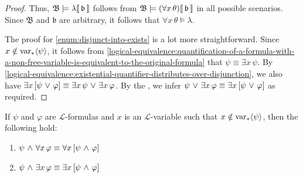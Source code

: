 \begin{proof}
    \vspace{0.3cm}
    \noindent
    Thus, \(  \mathfrak{B} \models \lambda\llbracket\, \mathfrak{b} \,\rrbracket \) follows from \( \folwffsatisfaction{\mathfrak{B}}{\mleft( \forall x \, \theta \mright)}{\mathfrak{b}} \)
    in all possible scenarios. Since \( \mathfrak{B} \) and \( \mathfrak{b} \) are arbitrary, it follows that \( \forall x \, \theta \models \lambda \).

    \vspace{0.3cm}
    \noindent
    The proof for \ref{enum:disjunct-into-exists} is a lot more straightforward.
    Since \( x \notin \operatorname{var}_{\ast} \langle\psi\rangle \), it follows from \cref{logical-equivalence:quantification-of-a-formula-with-a-non-free-variable-is-equivalent-to-the-original-formula}
    that \( \psi \equiv \exists x \, \psi \).
    By \cref{logical-equivalence:existential-quantifier-distributes-over-disjunction},
    we also have \( \exists x \, \mleft[ \psi \,\,{\lor}\,\, \varphi \mright] \equiv \exists x \, \psi \,\,{\lor}\,\, \exists x \, \varphi \).
    By the , we infer
    \( \psi \,\,{\lor}\,\, \exists x \, \varphi \equiv \exists x \, \mleft[ \psi \,\,{\lor}\,\, \varphi \mright] \) as required.
\end{proof}

\begin{thm}
     \label{logical-equivalence:grouping-conjuncts-into-quantified-formula}
    If \( \psi \) and \( \varphi \) are \( \mathcal{L} \)-formulas and \( x \) is an \( \mathcal{L} \)-variable such that
    \( x \notin \operatorname{var}_{\ast} \langle\psi\rangle \), then the following hold:
    \begin{enumerate}[topsep=2pt,label=\textup{\texttt{(\alph*)}}]
        \item \(  \psi \,\,{\land}\,\, \forall x \, \varphi \equiv \forall x \, \mleft[ \psi \,\,{\land}\,\, \varphi \mright]  \)  \label{enum:conjuncts-into-all}
        \item \(  \psi \,\,{\land}\,\, \exists x \, \varphi \equiv \exists x \, \mleft[ \psi \,\,{\land}\,\, \varphi \mright]  \)  \label{enum:conjuncts-into-exists}
    \end{enumerate}
\end{thm}

